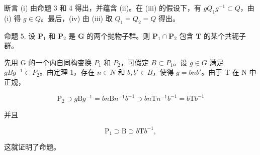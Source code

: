 断言 (i) 由命题 3 和 4 得出，并蕴含 (ii)。在 (iii) 的假设下，有 \(gQ_{1}g^{-1} \subset Q\)，由 (i) 得 \(g \in Q\)。最后，(iv) 由 (iii) 取 \(Q_{1} = Q_{2} = Q\) 得出。

命题 5. 设 \(\mathbf{P}_1\) 和 \(\mathbf{P}_2\) 是 \(\mathbf{G}\) 的两个抛物子群。则 \(\mathbf{P}_1 \cap \mathbf{P}_2\) 包含 \(\mathbf{T}\) 的某个共轭子群。

先用 G 的一个内自同构变换 \(P_{1}\) 和 \(P_{2}\)，可假定 \(B \subset P_{1}\)。设 \(g \in G\) 满足 \(gBg^{-1} \subset P_{2}\)。由定理 1，存在 \(n \in N\) 和 \(b, b' \in B\)，使得 \(g = bnb'\)。由于 T 在 N 中正规，

\[
\mathrm{P} _ {2} \supset g \mathrm{B} g ^ {- 1} = b n \mathrm{B} n ^ {- 1} b ^ {- 1} \supset b n \mathrm{T} n ^ {- 1} b ^ {- 1} = b \mathrm{T} b ^ {- 1}
\]

并且

\[
\mathrm{P} _ {1} \supset \mathrm{B} \supset b \mathrm{T} b ^ {- 1},
\]

这就证明了命题。


